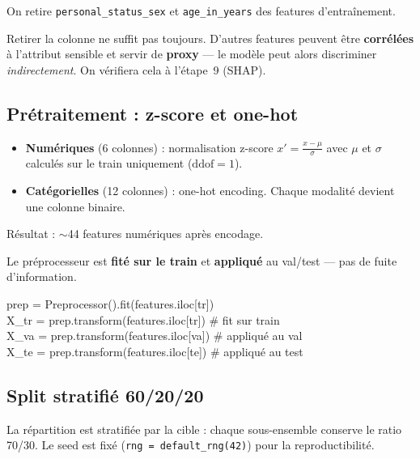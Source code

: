 \documentclass[11pt, a4paper]{article}
\begin{document}
On retire \texttt{personal\_status\_sex} et \texttt{age\_in\_years} des features d'entra\^{i}nement.

\begin{attentionbox}
Retirer la colonne ne suffit pas toujours. D'autres features peuvent \^{e}tre \textbf{corr\'{e}l\'{e}es} \`{a} l'attribut sensible et servir de \textbf{proxy} --- le mod\`{e}le peut alors discriminer \emph{indirectement}. On v\'{e}rifiera cela \`{a} l'\'{e}tape~9 (SHAP).
\end{attentionbox}

\subsection{Pr\'{e}traitement : z-score et one-hot}

\begin{itemize}
    \item \textbf{Num\'{e}riques} (6 colonnes) : normalisation z-score $\displaystyle x' = \frac{x - \mu}{\sigma}$ avec $\mu$ et $\sigma$ calcul\'{e}s sur le train uniquement ($\text{ddof}=1$).
    \item \textbf{Cat\'{e}gorielles} (12 colonnes) : one-hot encoding. Chaque modalit\'{e} devient une colonne binaire.
\end{itemize}

\noindent R\'{e}sultat : $\sim$44 features num\'{e}riques apr\`{e}s encodage.

Le pr\'{e}processeur est \textbf{fit\'{e} sur le train} et \textbf{appliqu\'{e}} au val/test --- pas de fuite d'information.

\begin{codebox}
prep = Preprocessor().fit(features.iloc[tr])\\
X\_tr = prep.transform(features.iloc[tr])  \# fit sur train\\
X\_va = prep.transform(features.iloc[va])  \# appliqu\'{e} au val\\
X\_te = prep.transform(features.iloc[te])  \# appliqu\'{e} au test
\end{codebox}

\subsection{Split stratifi\'{e} 60/20/20}

La r\'{e}partition est stratifi\'{e}e par la cible : chaque sous-ensemble conserve le ratio 70/30. Le seed est fix\'{e} (\texttt{rng = default\_rng(42)}) pour la reproductibilit\'{e}.
\end{document}
